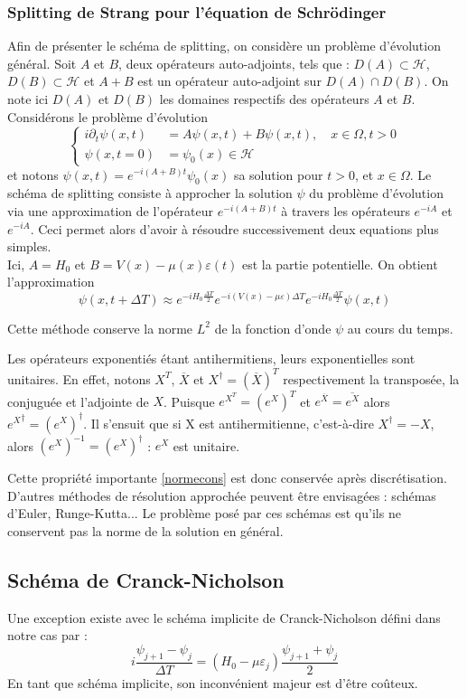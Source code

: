 \subsubsection{Splitting de Strang pour l'équation de Schrödinger}
Afin de présenter le schéma de splitting, on considère un problème d'évolution général. Soit $A$ et $B$, deux opérateurs auto-adjoints, tels que : $D(A) \subset \mathcal{H}$, $D(B) \subset \mathcal{H}$ et $A+B$ est un opérateur auto-adjoint sur $D(A) \cap D(B)$. On note ici $D(A)$ et $D(B)$ les domaines respectifs des opérateurs $A$ et $B$. Considérons le problème d'évolution
\begin{equation}
\begin{cases}
i \partial_t \psi (x,t) &= A\psi (x,t)+B\psi (x,t), \quad x \in \Omega, t>0 \\
\psi (x,t=0) &= \psi_0(x) \in \mathcal{H}
\end{cases}
\end{equation}
et notons $\psi(x,t)=e^{-i(A+B)t}\psi_0(x)$ sa solution pour $t>0$, et $x\in \Omega$. Le schéma de splitting consiste à approcher la solution $\psi$ du problème d'évolution via une approximation de l'opérateur $e^{-i(A+B)t}$ à travers les opérateurs $e^{-iA}$ et $e^{-iA}$. Ceci permet alors d'avoir à résoudre successivement deux equations plus simples. 
\\Ici, $A=H_0$ et $B=V(x)-\mu(x)\varepsilon(t)$ est la partie potentielle. On obtient l'approximation
\begin{equation}
\psi(x,t+\Delta T) \approx e^{-iH_0 \frac{\Delta T}{2}}e^{-i(V(x)-\mu\varepsilon)\Delta T}e^{-iH_0 \frac{\Delta T}{2}} \psi(x,t)
\end{equation}
\begin{pro}
	Cette méthode conserve la norme $L^2$ de la fonction d’onde $\psi$ au cours du temps.
\end{pro}
\begin{ proof }
	Les opérateurs exponentiés étant antihermitiens, leurs exponentielles sont unitaires. En effet, notons $X^{T}$, $\overline{X}$ et $X^{\dagger}=(\overline{X})^T$ respectivement la transposée, la conjuguée et l'adjointe de $X$. Puisque $e^{X^T}={(e^X)}^T$ et $e^{\overline{X}}=\overline{e^X}$ alors ${e^X}^{\dagger}={(e^X)}^{\dagger}$. Il s'ensuit que si X est antihermitienne, c'est-à-dire $X^{\dagger}=-X$, alors ${(e^X)}^{-1}={(e^X)}^{\dagger}$ : $e^X$ est unitaire.
\end{ proof }
Cette propriété importante \eqref{normecons} est donc conservée après discrétisation.\\
D’autres méthodes de résolution approchée peuvent être envisagées : schémas d’Euler, Runge-Kutta... Le problème posé par ces schémas est qu’ils ne conservent pas la norme de la solution en général.
\subsection{Schéma de Cranck-Nicholson}
Une exception existe avec le schéma implicite de Cranck-Nicholson défini dans notre cas par :
\begin{equation}
i\dfrac{\psi_{j+1}-\psi_j}{\Delta T}=(H_0-\mu\varepsilon_j)\dfrac{\psi_{j+1}+\psi_j}{2}
\end{equation}
En tant que schéma implicite, son inconvénient majeur est d’être coûteux.